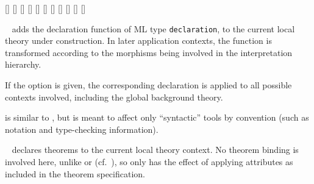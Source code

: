 \begin{isabellebody}
\begin{isamarkuptext}
  \begin{railoutput}
\rail@bar
{}[]
[]
\rail@endbar
\rail@bar
{}
[]
[]
[]
\rail@endbar
\rail@bar
{}
[]
\rail@endbar
{}[]
\rail@end
{}
[]
\rail@bar
{}
[]
\rail@endbar
\rail@plus
{}[]
[]
\rail@endplus
\rail@end
\end{railoutput}


  \begin{description}

  \item \hyperlink{command.declaration}{\mbox{}}~ adds the declaration
  function  of ML type \verb|declaration|, to the current
  local theory under construction.  In later application contexts, the
  function is transformed according to the morphisms being involved in
  the interpretation hierarchy.

  If the  option is given, the corresponding
  declaration is applied to all possible contexts involved, including
  the global background theory.

  \item \hyperlink{command.syntax-declaration}{\mbox{}} is similar to \hyperlink{command.declaration}{\mbox{}}, but is meant to affect only ``syntactic'' tools by
  convention (such as notation and type-checking information).

  \item \hyperlink{command.declare}{\mbox{}}~ declares theorems to the
  current local theory context.  No theorem binding is involved here,
  unlike \hyperlink{command.theorems}{\mbox{}} or \hyperlink{command.lemmas}{\mbox{}} (cf.\
  ), so \hyperlink{command.declare}{\mbox{}} only has the effect
  of applying attributes as included in the theorem specification.


\end{description}
\end{isamarkuptext}
\end{isabellebody}
